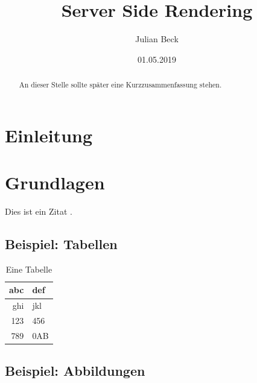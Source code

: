 \documentclass[runningheads]{llncs}
\title{Server Side Rendering}
\author{Julian Beck}
\institute{Betreuer: Prof. Dr. rer. nat. Christian Zirpins}
\date{01.05.2019}
\begin{document}
\let\oldaddcontentsline\addcontentsline
\def\addcontentsline#1#2#3{}
\maketitle
\def\addcontentsline#1#2#3{\oldaddcontentsline{#1}{#2}{#3}}


\begin{abstract}
  An dieser Stelle sollte später eine Kurzzusammenfassung stehen.
\end{abstract}

\tableofcontents 
\newpage

\section{Einleitung}
\label{sec:Einleitung}



\section{Grundlagen}
\label{sec:Grundlagen}


Dies ist ein Zitat \cite{becker2008a}.

\subsection{Beispiel: Tabellen}
\label{subsec:Tables}


\begin{table}[h]
  \centering
  \caption{Eine Tabelle}
  \label{tab:atable}
  \begin{tabular}{|r|l|} \hline
    abc & def\\ \hline
    ghi & jkl\\ \hline
    123 & 456\\ \hline
    789 & 0AB\\ \hline
  \end{tabular}
\end{table}


\subsection{Beispiel: Abbildungen}
\label{subsec:Abbildungen}
\end{document}
